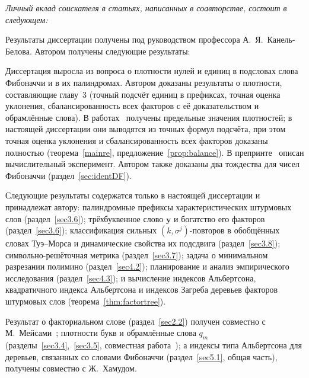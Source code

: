 \documentclass[a4paper,14pt]{extreport}
\theoremstyle{plain}
\theoremstyle{definition}
\theoremstyle{remark}
\begin{document}
	\textit{Личный вклад соискателя в статьях, написанных в соавторстве, состоит в следующем:}
	
	Результаты диссертации получены под руководством профессора А.~Я.~Канель-Белова. Автором получены следующие результаты:
	
	Диссертация выросла из вопроса о плотности нулей и единиц в подсловах слова Фибоначчи и в их палиндромах. Автором доказаны результаты о плотности, составляющие главу~3 (точный подсчёт единиц в префиксах, точная оценка уклонения, сбалансированность всех факторов с её доказательством и обрамлённые слова). В работах~\cite{HamoudAbdullahTver, HamoudAbdullah} получены предельные значения плотностей; в настоящей диссертации они выводятся из точных формул подсчёта, при этом точная оценка уклонения и сбалансированность всех факторов доказаны полностью (теорема~\ref{mainre}, предложение~\ref{prop:balance}). В препринте~\cite{Abdullah} описан вычислительный эксперимент. Автором также доказаны два тождества для чисел Фибоначчи (раздел~\ref{sec:identDF}).
	
	Следующие результаты содержатся только в настоящей диссертации и принадлежат автору: палиндромные префиксы характеристических штурмовых слов (раздел~\ref{sec3.6}); трёхбуквенное слово $\mathbf y$ и богатство его факторов (раздел~\ref{sec3.6}); классификация сильных $(k,\sigma^j)$-повторов в обобщённых словах Туэ--Морса и динамические свойства их подсдвига (раздел~\ref{sec3.8}); символьно-решёточная метрика (раздел~\ref{sec3.7}); задача о минимальном разрезании полимино (раздел~\ref{sec4.2}); планирование и анализ эмпирического исследования (раздел~\ref{sec4.3}); и вычисление индексов Альбертсона, квадратичного индекса Альбертсона и индексов Загреба деревьев факторов штурмовых слов (теорема~\ref{thm:factortree}).
	
	Результат о факториальном слове (раздел~\ref{sec2.2}) получен совместно с М.~Мейсами~\cite{Duaa23}; плотности букв и обрамлённые слова $q_m$ (разделы~\ref{sec3.4},~\ref{sec3.5}, совместная работа~\cite{HamoudAbdullah}); а индексы типа Альбертсона для деревьев, связанных со словами Фибоначчи (раздел~\ref{sec5.1}, общая часть), получены совместно с Ж.~Хамудом.
	
	\medskip 
	
\end{document}

